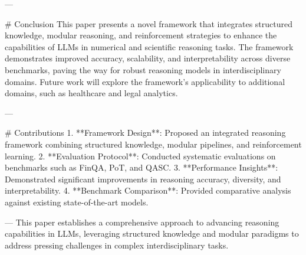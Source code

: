 ---

# Conclusion  
This paper presents a novel framework that integrates structured knowledge, modular reasoning, and reinforcement strategies to enhance the capabilities of LLMs in numerical and scientific reasoning tasks. The framework demonstrates improved accuracy, scalability, and interpretability across diverse benchmarks, paving the way for robust reasoning models in interdisciplinary domains. Future work will explore the framework's applicability to additional domains, such as healthcare and legal analytics.  

---

# Contributions  
1. **Framework Design**: Proposed an integrated reasoning framework combining structured knowledge, modular pipelines, and reinforcement learning.  
2. **Evaluation Protocol**: Conducted systematic evaluations on benchmarks such as FinQA, PoT, and QASC.  
3. **Performance Insights**: Demonstrated significant improvements in reasoning accuracy, diversity, and interpretability.  
4. **Benchmark Comparison**: Provided comparative analysis against existing state-of-the-art models.  

---  
This paper establishes a comprehensive approach to advancing reasoning capabilities in LLMs, leveraging structured knowledge and modular paradigms to address pressing challenges in complex interdisciplinary tasks.